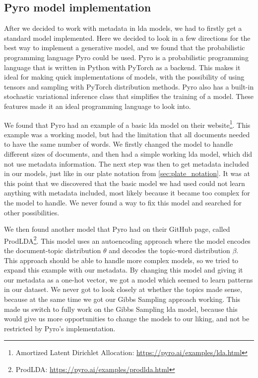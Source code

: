 \subsection{Pyro model implementation}
After we decided to work with metadata in \gls{lda} models, we had to firstly get a standard model implemented.
Here we decided to look in a few directions for the best way to implement a generative model, and we found that the probabilistic programming language Pyro could be used.
Pyro is a probabilistic programming language that is written in Python with PyTorch as a backend.
This makes it ideal for making quick implementations of models, with the possibility of using tensors and sampling with PyTorch distribution methods.
Pyro also has a built-in stochastic variational inference class that simplifies the training of a model.
These features made it an ideal programming language to look into.

We found that Pyro had an example of a basic \gls{lda} model on their website\footnote{Amortized Latent Dirichlet Allocation: \url{https://pyro.ai/examples/lda.html}}.
This example was a working model, but had the limitation that all documents needed to have the same number of words.
We firstly changed the model to handle different sizes of documents, and then had a simple working \gls{lda} model, which did not use metadata information.
The next step was then to get metadata included in our models, just like in our plate notation from \autoref{sec:plate_notation}.
It was at this point that we discovered that the basic model we had used could not learn anything with metadata included, most likely because it became too complex for the model to handle.
We never found a way to fix this model and searched for other possibilities.

We then found another model that Pyro had on their GitHub page, called ProdLDA\footnote{ProdLDA: \url{https://pyro.ai/examples/prodlda.html}}.
This model uses an autoencoding approach where the model encodes the document-topic distribution $\theta$ and decodes the topic-word distribution $\beta$.
This approach should be able to handle more complex models, so we tried to expand this example with our metadata.
By changing this model and giving it our metadata as a one-hot vector, we got a model which seemed to learn patterns in our dataset.
We never got to look closely at whether the topics made sense, because at the same time we got our Gibbs Sampling approach working.
This made us switch to fully work on the Gibbs Sampling \gls{lda} model, because this would give us more opportunities to change the models to our liking, and not be restricted by Pyro's implementation.